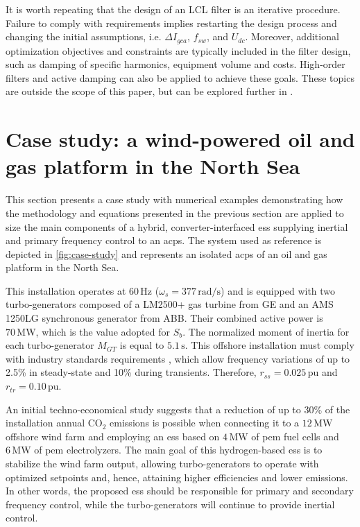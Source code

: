 \documentclass[utf8]{frontiersSCNS} %
\begin{document}
It is worth repeating that the design of an LCL filter is an iterative procedure. Failure to comply with requirements implies restarting the design process and changing the initial assumptions, i.e. $ \Delta I_{gca}$, $f_{sw}$, and $U_{dc}$. Moreover, additional optimization objectives and constraints are typically included in the filter design, such as damping of specific harmonics, equipment volume and costs. High-order filters and active damping can also be applied to achieve these goals. These topics are outside the scope of this paper, but can be explored further in \cite{jaliliDesignLCLFilters2009,channegowdaFilterOptimizationGrid2010,rockhillGridFilterDesignMultimegawatt2011,muhlethalerOptimalDesignLCL2013,beresOptimalDesignHighOrder2016,xuLCLresonanceDampingStrategies2018}. 

\section{Case study: a wind-powered oil and gas platform in the North Sea}\label{sec:case-study}

This section presents a case study with numerical examples demonstrating how the methodology and equations presented in the previous section are applied to size the main components of a hybrid, converter-interfaced \gls{ess} supplying inertial and primary frequency control to an \gls{acps}. The system used as reference is depicted in \cref{fig:case-study} and represents an isolated \gls{acps} of an oil and gas platform in the North Sea. 

This installation operates at $60\,\si{\hertz}$ ($ \omega_s = 377\,  \si{\radian\per\second}$) and is equipped with two turbo-generators composed of a LM2500+ gas turbine from GE and an AMS 1250LG synchronous generator from ABB. Their combined active power is $70\,\si{\mega\watt}$, which is the value adopted for $ S_b $. The normalized moment of inertia for each turbo-generator $M_{GT}$ is equal to $5.1\,\si{\second}$. This offshore installation must comply with industry standards requirements \citep{IEC6189220152019}, which allow frequency variations of up to 2.5\% in steady-state and 10\% during transients. Therefore, $ r_{ss} = 0.025$\,pu and $ r_{tr} = 0.10$\,pu. 

An initial techno-economical study \citep{riboldiInnovativeHybridEnergy2020} suggests that a reduction of up to 30\% of the installation annual CO$_2$ emissions is possible when connecting it to a $12\,\si{\mega\watt}$ offshore wind farm and employing an \gls{ess} based on $4\,\si{\mega\watt}$ of \gls{pem} fuel cells and $6\,\si{\mega\watt}$ of \gls{pem} electrolyzers. The main goal of this hydrogen-based \gls{ess} is to stabilize the wind farm output, allowing turbo-generators to operate with optimized setpoints and, hence, attaining higher efficiencies and lower emissions. In other words, the proposed \gls{ess} should be responsible for primary and secondary frequency control, while the turbo-generators will continue to provide inertial control.
\end{document}
